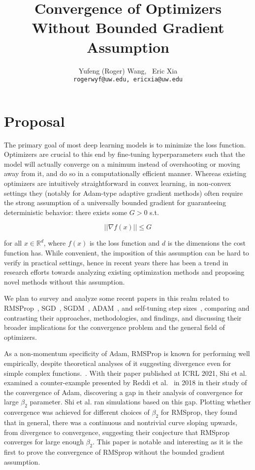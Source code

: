 \documentclass{article}
\title{Convergence of Optimizers Without Bounded Gradient Assumption}
\author{%
  Yufeng (Roger) Wang, \ Eric Xia \\
  \texttt{rogerwyf@uw.edu, ericxia@uw.edu} \\
}
\begin{document}
\maketitle


\section{Proposal}

The primary goal of most deep learning models is to minimize the loss function.
Optimizers are crucial to this end by fine-tuning hyperparameters such that the model will actually converge on a minimum instead of overshooting or moving away from it,
and do so in a computationally efficient manner.
Whereas existing optimizers are intuitively straightforward in convex learning, in non-convex settings they (notably for Adam-type adaptive gradient methods)
often require the strong assumption of a universally bounded gradient for guaranteeing deterministic behavior: there exists some $G > 0$ s.t.

\[
  ||\nabla f(x)|| \leq G
\]

for all $x\in\mathbb{R}^d$, where $f(x)$ is the loss function and $d$ is the dimensions the cost function has.
While convenient, the imposition of this assumption can be hard to verify in practical settings, hence in recent years there has been a trend in research efforts
towards analyzing existing optimization methods and proposing novel methods without this assumption.

We plan to survey and analyze some recent papers in this realm related to RMSProp~\cite{shi2021rmsprop}, SGD~\cite{https://doi.org/10.48550/arxiv.2006.10311},
SGDM~\cite{NEURIPS2020_d3f5d4de}, ADAM~\cite{https://doi.org/10.48550/arxiv.2106.08208}, and self-tuning step sizes~\cite{https://doi.org/10.48550/arxiv.2202.05791},
comparing and contrasting their approaches, methodologies, and findings, and discussing their broader implications for the convergence problem and the general field of optimizers.

As a non-momentum specificity of Adam, RMSProp is known for performing well empirically, despite theoretical analyses of it suggesting divergence even for simple complex functions.~\cite{shi2021rmsprop}.
With their paper published at ICRL 2021, Shi et al. examined a counter-example presented by Reddi et al.~\cite{DBLP:journals/corr/abs-1904-09237} in 2018 in their study of the convergence of Adam,
discovering a gap in their analysis of convergence for large $\beta_2$ parameter. Shi et al. ran simulations based on this gap.
Plotting whether convergence was achieved for different choices of $\beta_2$ for RMSprop, they found that in general, there was a continuous and nontrivial curve sloping upwards, from divergence to
convergence, suggesting their conjecture that RMSprop converges for large enough $\beta_2$. This paper is notable and interesting as it is the first to prove the convergence of RMSprop
without the bounded gradient assumption.
\end{document}
